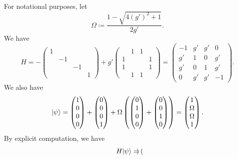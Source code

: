 \documentclass[11pt, letterpaper]{article}
\begin{document}
\begin{enumerate}
\begin{enumerate}
			For notational purposes, let
			\[
				\Omega \coloneqq \frac{1-\sqrt{4(g')^2+1} }{2g'} 
			.\]
			We have
			\[
				H=-\begin{pmatrix}
				1 &  &  &  \\
				 & -1 &  &  \\
				 &  & -1 &  \\
				 &  &  & 1
				\end{pmatrix}+g'\begin{pmatrix}
				 & 1 & 1 &  \\
				1 &  &  & 1 \\
				1 &  &  & 1 \\
				 & 1 & 1 & 
				\end{pmatrix}=\begin{pmatrix}
				-1 & g' & g' & 0 \\
				g' & 1 & 0 & g' \\
				g' & 0 & 1 & g' \\
				0 & g' & g' & -1
				\end{pmatrix}
			.\]
			We also have
			\[
				\lvert\psi \rangle =\begin{pmatrix}
				1 \\
				0 \\
				0 \\
				0
				\end{pmatrix}+\begin{pmatrix}
				0 \\
				0 \\
				0 \\
				1
				\end{pmatrix}+\Omega \left( \begin{pmatrix}
				0 \\
				1 \\
				0 \\
				0
				\end{pmatrix}+\begin{pmatrix}
				0 \\
				0 \\
				1 \\
				0
				\end{pmatrix} \right) =\begin{pmatrix}
				1 \\
				\Omega  \\
				\Omega  \\
				1
				\end{pmatrix}
			.\]
			By explicit computation, we have
			\[
				H \lvert\psi \rangle =\begin{pmatrix}

\end{pmatrix}\]
\end{enumerate}
\end{enumerate}
\end{document}
